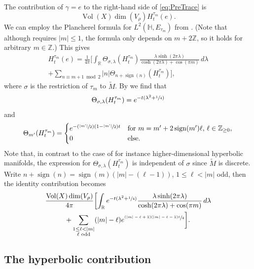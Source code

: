 \documentclass[JEP,XML,SOM,Unicode,NoFloatCountersInSection,published]{cedram}
\newcommand{\Psfrac}[2]{(\sfrac{#1}{#2})}
\theoremstyle{plain}
\theoremstyle{definition}
\theoremstyle{remark}
\newcommand{\R}{\mathbb{R}}
\newcommand{\Z}{\mathbb{Z}}
\renewcommand{\H}{\mathbb{H}}
\DeclareMathOperator{\Vol}{Vol}
\DeclareMathOperator{\sign}{sign}
\numberwithin{equation}{section}
\begin{document}
The contribution of $\gamma=e$ to the right-hand side of \cref{eq:PreTrace} is
\[
\Vol(X)\dim(V_\rho)H_t^{\tau_m}(e).
\]
We can employ the Plancherel formula for $L^2(\H,E_{\tau_m})$ from \cite[Lem.\,5]{Hof94}. (Note that although \cite[Lem.\,5]{Hof94} requires $|m|\leq1$, the formula only depends on $m+2\Z$, so it holds for arbitrary $m\in\Z$.) This gives
\begin{multline*}
H_t^{\tau_m}(e) = \frac{1}{4\pi}\bigg[\int_\R \Theta_{\sigma,\lambda}(H_t^{\tau_m})\frac{\lambda\sinh(2\pi\lambda)}{\cosh(2\pi\lambda)+\cos(\pi m)}\,d\lambda\\[-5pt]
+ \sum_{n\equiv m+1\bmod2}|n|\Theta_{n+\sign(n)}(H_t^{\tau_m})\bigg],
\end{multline*}
where $\sigma$ is the restriction of $\tau_m$ to $\widetilde{M}$. By \cite[p.\,2634]{MPf} we find that
\begin{equation}
\Theta_{\sigma,\lambda}(H_t^{\tau_m}) = e^{-t(\lambda^2+\sfrac{1}{4})}\label{eq:PSCharacterHeatKernel}
\end{equation}
and
\begin{equation}
\Theta_{m'}(H_t^{\tau_m}) = \begin{cases}e^{-\Psfrac{|m'|}{2}(1-\sfrac{|m'|}{2})t}&\mbox{for $m=m'+2\sign(m')\ell$, $\ell\in\Z_{\geq0}$,}\\0&\mbox{else.}\end{cases}\label{eq:DSCharacterHeatKernel}
\end{equation}
Note that, in contrast to the case of for instance higher-dimensional hyperbolic manifolds, the expression for $\Theta_{\sigma,\lambda}(H_t^{\tau_m})$ is independent of $\sigma$ since $\widetilde{M}$ is discrete. Write $n+\sign(n)=\sign(m)(|m|-(\ell-1))$, $1\leq\ell<|m|$ odd, then the identity contribution becomes
\begin{multline*}
\frac{\Vol(X)\dim(V_\rho)}{4\pi}\biggl[\int_\R e^{-t(\lambda^2+\sfrac{1}{4})}\frac{\lambda\sinh(2\pi\lambda)}{\cosh(2\pi\lambda)+\cos(\pi m)}\,d\lambda\\
+ \sum_{\substack{1\leq\ell<|m|\\\ell\textup{ odd}}}(|m|-\ell)e^{\sfrac{(|m|-\ell+1)(|m|-\ell-1)t}{4}}\biggr].
\end{multline*}

\subsection{The hyperbolic contribution}
\label{subsec:hyp}
\end{document}
